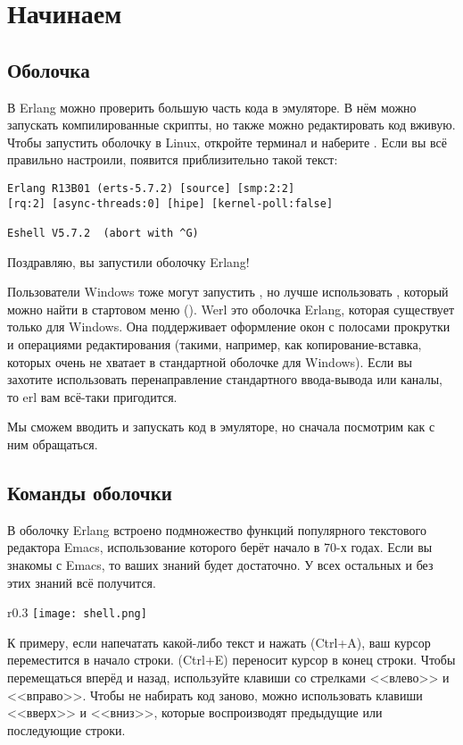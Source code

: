 \chapter{Начинаем}
\section{Оболочка}
В Erlang можно проверить большую часть кода в эмуляторе.
В нём можно запускать компилированные скрипты, но также можно редактировать код вживую.
Чтобы запустить оболочку в Linux, откройте терминал и наберите .
Если вы всё правильно настроили, появится приблизительно такой текст: 
\begin{lstlisting}[style=repl]
Erlang R13B01 (erts-5.7.2) [source] [smp:2:2] 
[rq:2] [async-threads:0] [hipe] [kernel-poll:false] 
 
Eshell V5.7.2  (abort with ^G) 
\end{lstlisting}

Поздравляю, вы запустили оболочку Erlang! 

Пользователи Windows тоже могут запустить , но лучше использовать , который можно найти в стартовом меню ().
Werl это оболочка Erlang, которая существует только для Windows.
Она поддерживает оформление окон с полосами прокрутки и операциями редактирования (такими, например, как копирование\--вставка, которых очень не хватает в стандартной оболочке  для Windows).
Если вы захотите использовать перенаправление стандартного ввода\--вывода или каналы, то erl вам всё\--таки пригодится. 

Мы сможем вводить и запускать код в эмуляторе, но сначала посмотрим как с ним обращаться.
\section{Команды оболочки}
В оболочку Erlang встроено подмножество функций популярного текстового редактора Emacs, использование которого берёт начало в 70\--х годах.
Если вы знакомы с Emacs, то ваших знаний будет достаточно.
У всех остальных и без этих знаний всё получится.

\begin{wrapfigure}{r}{0.3\linewidth}
    \texttt{[image: shell.png]}
\end{wrapfigure}
К примеру, если напечатать какой\--либо текст и нажать (Ctrl+A), ваш курсор переместится в начало строки.
(Ctrl+E) переносит курсор в конец строки.
Чтобы перемещаться вперёд и назад, используйте клавиши со стрелками <<влево>> и <<вправо>>.
Чтобы не набирать код заново, можно использовать клавиши <<вверх>> и <<вниз>>, которые воспроизводят предыдущие или последующие строки.

